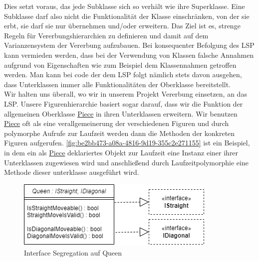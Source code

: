 \documentclass[
10pt, %
a4paper, %
oneside, %
headinclude,footinclude, %
BCOR5mm, %
]{scrartcl}
\begin{document}
\begin{onehalfspace}
Dies setzt voraus, das jede Subklasse sich so verhält wie ihre Superklasse. Eine Subklasse darf also nicht die Funktionalität der Klasse einschränken, von der sie erbt, sie darf sie nur übernehmen und/oder erweitern. Das Ziel ist es, strenge Regeln für Vererbungshierarchien zu definieren und damit auf dem Varianzensystem der Vererbung aufzubauen. Bei konsequenter Befolgung des LSP kann vermieden werden, dass bei der Verwendung von Klassen falsche Annahmen aufgrund von Eigenschaften wie zum Beispiel dem Klassennahmen getroffen werden. Man kann bei code der dem LSP folgt nämlich stets davon ausgehen, dass Unterklassen immer alle Funktionalitäten der Oberklasse bereitstellt.
\\
Wir halten uns überall, wo wir in unserem Projekt Vererbung einsetzen, an das LSP. Unsere Figurenhierarchie basiert sogar darauf, dass wir die Funktion der allgemeinen Oberklasse \href{https://github.com/schmida736/Chess-AdvancedSE/blob/main/Chess-AdvancedSE/Game\%20Elements/Pieces/Piece.cs}{Piece} in ihren Unterklassen erweitern. Wir benutzen \href{https://github.com/schmida736/Chess-AdvancedSE/blob/main/Chess-AdvancedSE/Game\%20Elements/Pieces/Piece.cs}{Piece} oft als eine verallgemeinerung der verschiedenen Figuren und durch polymorphe Aufrufe zur Laufzeit werden dann die Methoden der konkreten Figuren aufgerufen. \autoref{fig:be2bb473-a08a-4816-9d19-355c2e271155} ist ein Beispiel, in dem ein als \href{https://github.com/schmida736/Chess-AdvancedSE/blob/main/Chess-AdvancedSE/Game\%20Elements/Pieces/Piece.cs}{Piece} deklariertes Objekt zur Laufzeit eine Instanz einer ihrer Unterklassen zugewiesen wird und anschließend durch Laufzeitpolymorphie eine Methode dieser unterklasse ausgeführt wird.

\begin{figure}[ht]
	\centering
	\includegraphics[width=0.5\linewidth]{Diagonal_Straight.png}
	\caption[Interface Segregation auf Queen]{Interface Segregation auf Queen}
	\label{fig:int_seg}
\end{figure}


\end{onehalfspace}
\end{document}
